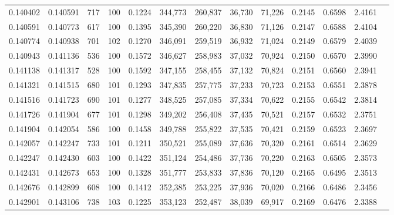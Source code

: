\begin{tabular}{rrrrrrrrrrrrr}
0.140402 & 0.140591 &   717 & 100 &                                     0.1224 & 344,773 & 260,837 &  36,730 &  71,226 & 0.2145 & 0.6598 & 2.4161 \\
0.140591 & 0.140773 &   617 & 100 &                                     0.1395 & 345,390 & 260,220 &  36,830 &  71,126 & 0.2147 & 0.6588 & 2.4104 \\
0.140774 & 0.140938 &   701 & 102 &                                     0.1270 & 346,091 & 259,519 &  36,932 &  71,024 & 0.2149 & 0.6579 & 2.4039 \\
0.140943 & 0.141136 &   536 & 100 &                                     0.1572 & 346,627 & 258,983 &  37,032 &  70,924 & 0.2150 & 0.6570 & 2.3990 \\
0.141138 & 0.141317 &   528 & 100 &                                     0.1592 & 347,155 & 258,455 &  37,132 &  70,824 & 0.2151 & 0.6560 & 2.3941 \\
0.141321 & 0.141515 &   680 & 101 &                                     0.1293 & 347,835 & 257,775 &  37,233 &  70,723 & 0.2153 & 0.6551 & 2.3878 \\
0.141516 & 0.141723 &   690 & 101 &                                     0.1277 & 348,525 & 257,085 &  37,334 &  70,622 & 0.2155 & 0.6542 & 2.3814 \\
0.141726 & 0.141904 &   677 & 101 &                                     0.1298 & 349,202 & 256,408 &  37,435 &  70,521 & 0.2157 & 0.6532 & 2.3751 \\
0.141904 & 0.142054 &   586 & 100 &                                     0.1458 & 349,788 & 255,822 &  37,535 &  70,421 & 0.2159 & 0.6523 & 2.3697 \\
0.142057 & 0.142247 &   733 & 101 &                                     0.1211 & 350,521 & 255,089 &  37,636 &  70,320 & 0.2161 & 0.6514 & 2.3629 \\
0.142247 & 0.142430 &   603 & 100 &                                     0.1422 & 351,124 & 254,486 &  37,736 &  70,220 & 0.2163 & 0.6505 & 2.3573 \\
0.142431 & 0.142673 &   653 & 100 &                                     0.1328 & 351,777 & 253,833 &  37,836 &  70,120 & 0.2165 & 0.6495 & 2.3513 \\
0.142676 & 0.142899 &   608 & 100 &                                     0.1412 & 352,385 & 253,225 &  37,936 &  70,020 & 0.2166 & 0.6486 & 2.3456 \\
0.142901 & 0.143106 &   738 & 103 &                                     0.1225 & 353,123 & 252,487 &  38,039 &  69,917 & 0.2169 & 0.6476 & 2.3388 \\

\end{tabular}
